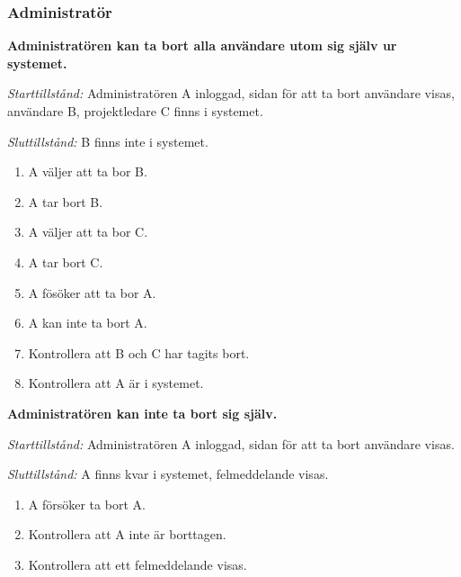 \documentclass[a4paper]{article}
\begin{document}
\subsubsection{Administratör}
\begin{FT}
\item
\textbf{Administratören kan ta bort alla användare utom sig själv ur systemet.}

\emph{Starttillstånd:} Administratören A inloggad, sidan för att ta bort användare visas, användare B, projektledare C finns i systemet.

\emph{Sluttillstånd:} B finns inte i systemet.

\begin{enumerate}
\item A väljer att ta bor B.
\item A tar bort B.
\item A väljer att ta bor C.
\item A tar bort C.
\item A fösöker att ta bor A.
\item A kan inte ta bort A.
\item Kontrollera att B och C har tagits bort.
\item Kontrollera att A är i systemet.

\end{enumerate}

\item
\textbf{Administratören kan inte ta bort sig själv.}

\emph{Starttillstånd:} Administratören A inloggad, sidan för att ta bort användare visas.

\emph{Sluttillstånd:} A finns kvar i systemet, felmeddelande visas.

\begin{enumerate}
\item A försöker ta bort A.
\item Kontrollera att A inte är borttagen.
\item Kontrollera att ett felmeddelande visas.
\end{enumerate}

\end{FT}
\end{document}
